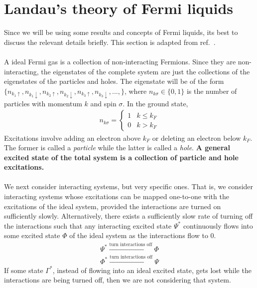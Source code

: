 \documentclass[twoside,11pt]{report}
\numberwithin{equation}{section}
\begin{document}
\section{Landau's theory of Fermi liquids}
Since we will be using some results and concepts of Fermi liquids, its best to discuss the relevant details briefly. This section is adapted from ref.~\cite{pethick}. 
\\\\A ideal Fermi gas is a collection of non-interacting Fermions.
Since they are non-interacting, the eigenstates of the complete system are just the collections of the eigenstates of the particles and holes.
The eigenstate will be of  the form \(\{n_{k_1\uparrow},n_{k_1\downarrow},n_{k_2\uparrow},n_{k_2\downarrow},n_{k_3\uparrow},n_{k_3\downarrow},...,\}\), where \(n_{k\sigma}\in\{0,1\}\) is the number of particles with momentum \(k\) and spin \(\sigma\).
In the ground state,
\begin{equation}\begin{aligned}
n_{k\sigma} = \begin{cases} 1 & k \leq k_F \\ 0 & k>k_F \end{cases} 
\end{aligned}\end{equation}
Excitations involve adding an electron above \(k_F\) or deleting an electron below \(k_F\).
The former is called a \textit{particle} while the latter is called a \textit{hole}.
\textbf{A general excited state of the total system is a collection of particle and hole excitations.}\\\\
We next consider interacting systems, but very specific ones.
That is, we consider interacting systems whose excitations can be mapped one-to-one with the excitations of the ideal system, provided the interactions are turned on sufficiently slowly.
Alternatively, there exists a sufficiently slow rate of turning off the interactions such that any interacting excited state \(\Psi^*\) continuously flows into some excited state \(\Phi\) of the ideal system as the interactions flow to 0.
\begin{gather}
\Psi^* \xrightarrow{\text{turn interactions off}} \Phi \\
\Phi^* \xrightarrow{\text{turn interactions off}} \Psi
\end{gather}
If some state \(\Gamma^*\), instead of flowing into an ideal excited state, gets lost while the interactions are being turned off, then we are not considering that system.
\end{document}
